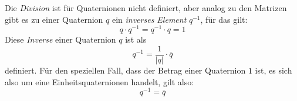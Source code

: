 Die \emph{Division} ist für Quaternionen nicht definiert, aber analog zu den Matrizen gibt es zu einer Quaternion $q$ ein \emph{inverses Element} $q^{-1}$, für das gilt:
\begin{equation}
 q \cdot q^{-1} = q^{-1} \cdot q = 1
\end{equation}
Diese \emph{Inverse} einer Quaternion $q$ ist als
\begin{equation}
 q^{-1} = \frac{1}{\left| q \right|} \cdot \overline{q}
\end{equation}
definiert. Für den speziellen Fall, dass der Betrag einer Quaternion $1$ ist, es sich also um eine Einheitsquaternionen handelt, gilt also:
\begin{equation}
 q^{-1} = \overline{q}
\end{equation}